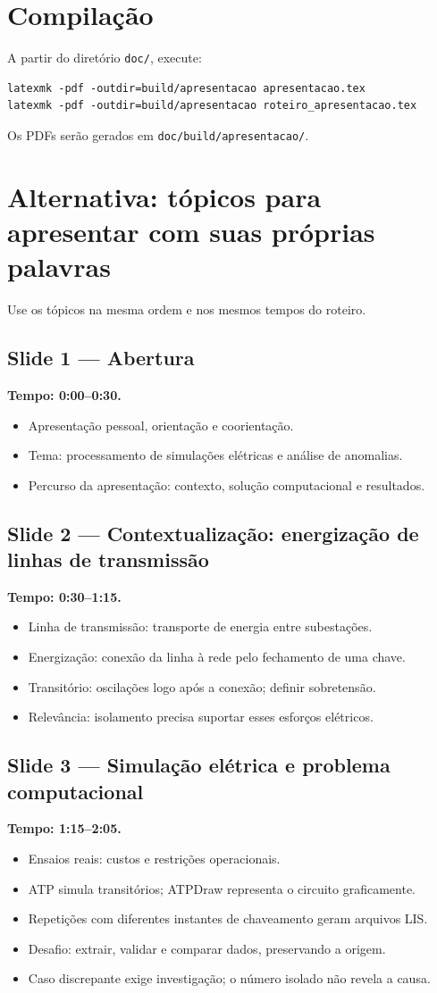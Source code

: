 \documentclass[11pt,a4paper]{article}
\newcommand{\slide}[3]{\Needspace{8\baselineskip}
  \subsection*{Slide #1 --- #2}
  \textbf{Tempo: #3.}\par}
\begin{document}
\section*{Compilação}
A partir do diretório \texttt{doc/}, execute:
\begin{verbatim}
latexmk -pdf -outdir=build/apresentacao apresentacao.tex
latexmk -pdf -outdir=build/apresentacao roteiro_apresentacao.tex
\end{verbatim}
Os PDFs serão gerados em \texttt{doc/build/apresentacao/}.

\clearpage
\section*{Alternativa: tópicos para apresentar com suas próprias palavras}
Use os tópicos na mesma ordem e nos mesmos tempos do roteiro.

\slide{1}{Abertura}{0:00--0:30}
\begin{itemize}
\item Apresentação pessoal, orientação e coorientação.
\item Tema: processamento de simulações elétricas e análise de anomalias.
\item Percurso da apresentação: contexto, solução computacional e resultados.
\end{itemize}

\slide{2}{Contextualização: energização de linhas de transmissão}{0:30--1:15}
\begin{itemize}
\item Linha de transmissão: transporte de energia entre subestações.
\item Energização: conexão da linha à rede pelo fechamento de uma chave.
\item Transitório: oscilações logo após a conexão; definir sobretensão.
\item Relevância: isolamento precisa suportar esses esforços elétricos.
\end{itemize}

\slide{3}{Simulação elétrica e problema computacional}{1:15--2:05}
\begin{itemize}
\item Ensaios reais: custos e restrições operacionais.
\item ATP simula transitórios; ATPDraw representa o circuito graficamente.
\item Repetições com diferentes instantes de chaveamento geram arquivos LIS.
\item Desafio: extrair, validar e comparar dados, preservando a origem.
\item Caso discrepante exige investigação; o número isolado não revela a causa.
\end{itemize}
\end{document}
